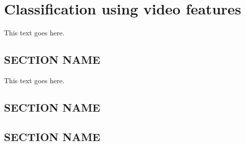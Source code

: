 \chapter{Classification using video features}

This text goes here.

\section{SECTION NAME}
This text goes here.

\section{SECTION NAME}

\section{SECTION NAME}
